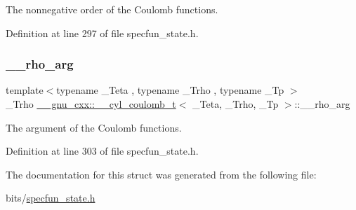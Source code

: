 The nonnegative order of the Coulomb functions. 



Definition at line 297 of file specfun\+\_\+state.\+h.

\mbox{\label{struct____gnu__cxx_1_1____cyl__coulomb__t_abbff84a3b281ef7fc6f16245c02b695d}} 
\subsubsection{\texorpdfstring{\+\_\+\+\_\+rho\+\_\+arg}{\_\_rho\_arg}}
{\footnotesize\ttfamily template$<$typename \+\_\+\+Teta , typename \+\_\+\+Trho , typename \+\_\+\+Tp $>$ \\
\+\_\+\+Trho \hyperlink{struct____gnu__cxx_1_1____cyl__coulomb__t}{\+\_\+\+\_\+gnu\+\_\+cxx\+::\+\_\+\+\_\+cyl\+\_\+coulomb\+\_\+t}$<$ \+\_\+\+Teta, \+\_\+\+Trho, \+\_\+\+Tp $>$\+::\+\_\+\+\_\+rho\+\_\+arg}



The argument of the Coulomb functions. 



Definition at line 303 of file specfun\+\_\+state.\+h.



The documentation for this struct was generated from the following file\+:\begin{DoxyCompactItemize}
\item 
bits/\hyperlink{specfun__state_8h}{specfun\+\_\+state.\+h}\end{DoxyCompactItemize}
